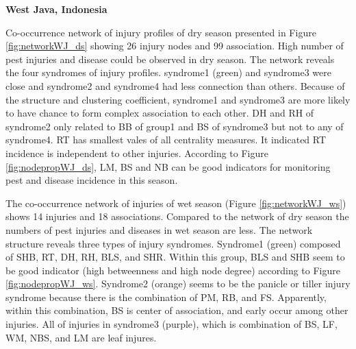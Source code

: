 \textbf{West Java, Indonesia}

Co-occurrence network of injury profiles of dry season presented in Figure \ref{fig:networkWJ_ds} showing 26 injury nodes and 99 association. High number of pest injuries and disease could be observed in dry season.  The network reveals the four syndromes of injury profiles. syndrome1 (green) and syndrome3 were close and syndrome2 and syndrome4 had less connection than others. Because of the structure and clustering coefficient, syndrome1 and syndrome3 are more likely to have chance to form complex association to each other. DH and RH of syndrome2 only related to BB of group1 and BS of syndrome3 but not to any of syndrome4. RT has smallest vales of all centrality measures. It indicated RT incidence is independent to other injuries.  According to Figure \ref{fig:nodepropWJ_ds}, LM, BS and NB can be good indicators for monitoring pest and disease incidence in this season.

The co-occurrence network of injuries of wet season (Figure \ref{fig:networkWJ_ws}) shows 14 injuries and 18 associations. Compared to the network of dry season the numbers of pest injuries and diseases in wet season are less. The network structure reveals three types of injury syndromes. Syndrome1 (green) composed of SHB, RT, DH, RH, BLS, and SHR.  Within this group, BLS and SHB seem to be good indicator (high betweenness and high node degree) according to Figure \ref{fig:nodepropWJ_ws}. Syndrome2 (orange) seems to be the panicle or tiller injury syndrome because there is the combination of PM, RB, and FS. Apparently, within this combination, BS is center of association, and early occur among other injuries. All of injuries in syndrome3 (purple), which is combination of BS, LF, WM, NBS, and LM are leaf injures. 

